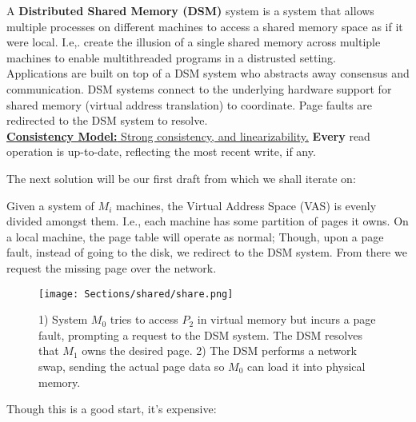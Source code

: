 \begin{Def}
    
    A \textbf{Distributed Shared Memory (DSM)} system is a system that allows multiple processes on different machines to access a shared memory space as if it were local.
    I.e,. create the illusion of a single shared memory across multiple machines to enable multithreaded programs in a distrusted setting.\\

    \noindent
    Applications are built on top of a DSM system who abstracts away consensus and communication. DSM systems 
    connect to the underlying hardware support for shared memory (virtual address translation) to coordinate.
    Page faults are redirected to the DSM system to resolve.\\

    \noindent
    \underline{\textbf{Consistency Model:} Strong consistency, and linearizability.} \textbf{Every} read operation is up-to-date, reflecting the most recent write, if any.

\end{Def}

\noindent
The next solution will be our first draft from which we shall iterate on:
\begin{Def}

    Given a system of $M_i$ machines, the Virtual Address Space (VAS) is evenly divided amongst them. I.e.,
    each machine has some partition of pages it owns. On a local machine, the page table will operate as normal;
    Though, upon a page fault, instead of going to the disk, we redirect to the DSM system. From there we request the missing page
    over the network.
\end{Def}

\begin{figure}[h]
    \centering
    \texttt{[image: Sections/shared/share.png]}
    \caption{1) System $M_0$ tries to access $P_2$ in virtual memory but incurs a page fault, prompting a request to the DSM system. The DSM resolves that $M_1$ owns the desired page. 
    2) The DSM performs a network swap, sending the actual page data so $M_0$ can load it into physical memory.
    }
    \label{fig:dsm}
\end{figure}

\newpage 

\noindent
Though this is a good start, it's expensive:

